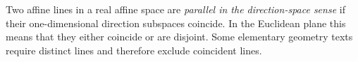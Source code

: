 
Two affine lines in a real affine space are \emph{parallel in the direction-space sense} if their one-dimensional direction subspaces coincide. In the Euclidean plane this means that they either coincide or are disjoint. Some elementary geometry texts require distinct lines and therefore exclude coincident lines.
